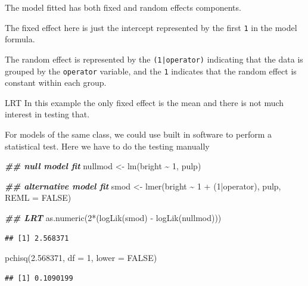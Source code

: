 \documentclass[
  ignorenonframetext,
]{beamer}
\newenvironment{Shaded}{\begin{snugshade}}{\end{snugshade}}
\newcommand{\AttributeTok}[1]{\textcolor[rgb]{0.77,0.63,0.00}{#1}}
\newcommand{\ConstantTok}[1]{\textcolor[rgb]{0.00,0.00,0.00}{#1}}
\newcommand{\DecValTok}[1]{\textcolor[rgb]{0.00,0.00,0.81}{#1}}
\newcommand{\DocumentationTok}[1]{\textcolor[rgb]{0.56,0.35,0.01}{\textbf{\textit{#1}}}}
\newcommand{\FloatTok}[1]{\textcolor[rgb]{0.00,0.00,0.81}{#1}}
\newcommand{\FunctionTok}[1]{\textcolor[rgb]{0.00,0.00,0.00}{#1}}
\newcommand{\NormalTok}[1]{#1}
\newcommand{\OtherTok}[1]{\textcolor[rgb]{0.56,0.35,0.01}{#1}}
\newcommand{\SpecialCharTok}[1]{\textcolor[rgb]{0.00,0.00,0.00}{#1}}
\begin{document}
\begin{frame}{}
\protect\hypertarget{section-3}{}
The model fitted has both fixed and random effects components.

The fixed effect here is just the intercept represented by the first
\texttt{1} in the model formula.

The random effect is represented by the \texttt{(1|operator)} indicating
that the data is grouped by the \texttt{operator} variable, and the
\texttt{1} indicates that the random effect is constant within each
group.
\end{frame}

\begin{frame}{LRT}
\protect\hypertarget{lrt}{}
In this example the only fixed effect is the mean and there is not much
interest in testing that.

For models of the same class, we could use built in software to perform
a statistical test. Here we have to do the testing manually
\end{frame}

\begin{frame}[fragile]{}
\protect\hypertarget{section-4}{}
\vspace{12pt}
\small

\begin{Shaded}
\begin{Highlighting}[]
\DocumentationTok{\#\# null model fit}
\NormalTok{nullmod }\OtherTok{\textless{}{-}} \FunctionTok{lm}\NormalTok{(bright }\SpecialCharTok{\textasciitilde{}} \DecValTok{1}\NormalTok{, pulp) }

\DocumentationTok{\#\# alternative model fit}
\NormalTok{smod }\OtherTok{\textless{}{-}} \FunctionTok{lmer}\NormalTok{(bright }\SpecialCharTok{\textasciitilde{}} \DecValTok{1} \SpecialCharTok{+}\NormalTok{ (}\DecValTok{1}\SpecialCharTok{|}\NormalTok{operator), pulp, }\AttributeTok{REML =} \ConstantTok{FALSE}\NormalTok{)}

\DocumentationTok{\#\# LRT}
\FunctionTok{as.numeric}\NormalTok{(}\DecValTok{2}\SpecialCharTok{*}\NormalTok{(}\FunctionTok{logLik}\NormalTok{(smod) }\SpecialCharTok{{-}} \FunctionTok{logLik}\NormalTok{(nullmod)))}
\end{Highlighting}
\end{Shaded}

\begin{verbatim}
## [1] 2.568371
\end{verbatim}

\begin{Shaded}
\begin{Highlighting}[]
\FunctionTok{pchisq}\NormalTok{(}\FloatTok{2.568371}\NormalTok{, }\AttributeTok{df =} \DecValTok{1}\NormalTok{, }\AttributeTok{lower =} \ConstantTok{FALSE}\NormalTok{)}
\end{Highlighting}
\end{Shaded}

\begin{verbatim}
## [1] 0.1090199
\end{verbatim}
\end{frame}
\end{document}
